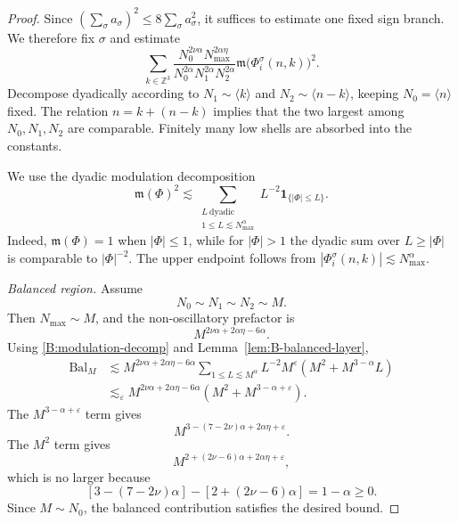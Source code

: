 \documentclass[10pt]{amsart}
\numberwithin{equation}{section}
\theoremstyle{plain}
\theoremstyle{definition}
\theoremstyle{remark}
\newcommand{\Z}{\mathbb{Z}}
\newcommand{\eps}{\varepsilon}
\newcommand{\la}{\langle}
\newcommand{\ra}{\rangle}
\newcommand{\frakm}{\mathfrak{m}}
\begin{document}
\begin{proof}
Since \((\sum_\sigma a_\sigma)^2\le8\sum_\sigma a_\sigma^2\), it suffices to estimate one fixed sign branch.  We therefore fix \(\sigma\) and estimate
\[
        \sum_{k\in\Z^3}
        \frac{N_0^{2\nu\alpha}N_{\max}^{2\alpha\eta}}
             {N_0^{2\alpha}N_1^{2\alpha}N_2^{2\alpha}}
        \frakm\bigl(\Phi_i^\sigma(n,k)\bigr)^2.
\]
Decompose dyadically according to \(N_1\sim\la k\ra\) and \(N_2\sim\la n-k\ra\), keeping \(N_0=\la n\ra\) fixed.  The relation \(n=k+(n-k)\) implies that the two largest among \(N_0,N_1,N_2\) are comparable.  Finitely many low shells are absorbed into the constants.

We use the dyadic modulation decomposition
\begin{equation}\label{B:modulation-decomp}
        \frakm(\Phi)^2
        \lesssim
        \sum_{\substack{L\ \mathrm{dyadic}\\1\le L\lesssim N_{\max}^{\alpha}}}
        L^{-2}\mathbf 1_{\{|\Phi|\le L\}}.
\end{equation}
Indeed, \(\frakm(\Phi)=1\) when \(|\Phi|\le1\), while for \(|\Phi|>1\) the dyadic sum over \(L\ge|\Phi|\) is comparable to \(|\Phi|^{-2}\).  The upper endpoint follows from \(|\Phi_i^\sigma(n,k)|\lesssim N_{\max}^\alpha\).

\emph{Balanced region.}  Assume
\[
        N_0\sim N_1\sim N_2\sim M.
\]
Then \(N_{\max}\sim M\), and the non-oscillatory prefactor is
\[
        M^{2\nu\alpha+2\alpha\eta-6\alpha}.
\]
Using \eqref{B:modulation-decomp} and Lemma~\ref{lem:B-balanced-layer},
\[
\begin{aligned}
        \mathrm{Bal}_M
        &\lesssim
        M^{2\nu\alpha+2\alpha\eta-6\alpha}
        \sum_{1\le L\lesssim M^\alpha}
        L^{-2}M^\eps(M^2+M^{3-\alpha}L) \\
        &\lesssim_\eps
        M^{2\nu\alpha+2\alpha\eta-6\alpha}
        (M^2+M^{3-\alpha+\eps}).
\end{aligned}
\]
The \(M^{3-\alpha+\eps}\) term gives
\[
        M^{3-(7-2\nu)\alpha+2\alpha\eta+\eps}.
\]
The \(M^2\) term gives
\[
        M^{2+(2\nu-6)\alpha+2\alpha\eta+\eps},
\]
which is no larger because
\[
        [3-(7-2\nu)\alpha]-[2+(2\nu-6)\alpha]=1-\alpha\ge0.
\]
Since \(M\sim N_0\), the balanced contribution satisfies the desired bound.


\end{proof}
\end{document}
